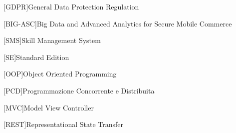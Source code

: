 \begin{acronym}
[GDPR]{General Data Protection Regulation}%

[BIG-ASC]{Big Data and Advanced Analytics for Secure Mobile Commerce}%

[SMS]{Skill Management System}%

[SE]{Standard Edition}%

[OOP]{Object Oriented Programming}%

[PCD]{Programmazione Concorrente e Distribuita}%

[MVC]{Model View Controller}%

[REST]{Representational State Transfer}%


\end{acronym}
